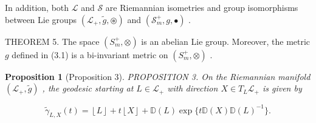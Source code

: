 \documentclass[11pt]{article}
\newtheorem{proposition}{Proposition}
\begin{document}
In addition, both  $\mathcal{L}$  and  $\mathcal{S}$  are Riemannian isometries and group isomorphisms between Lie groups  $(\mathcal{L}_{+},\tilde{g},\circledast)$  and  $(\mathcal{S}_m^+,g,\bullet)$ .

THEOREM 5. The space  $(S_m^+, \otimes)$  is an abelian Lie group. Moreover, the metric  $g$  defined in (3.1) is a bi-invariant metric on  $(S_m^+, \otimes)$ .


\begin{proposition}[Proposition 3]
PROPOSITION 3. On the Riemannian manifold  $(\mathcal{L}_{+},\tilde{g})$ , the geodesic starting at  $L\in \mathcal{L}_{+}$  with direction  $X\in T_{L}\mathcal{L}_{+}$  is given by

$$
\tilde {\gamma} _ {L, X} (t) = \left\lfloor L \right\rfloor + t \left\lfloor X \right\rfloor + \mathbb {D} (L) \exp \{t \mathbb {D} (X) \mathbb {D} (L) ^ {- 1} \}.
$$
\end{proposition}
\end{document}
